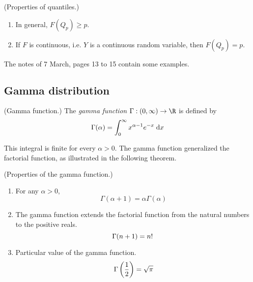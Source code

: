 \documentclass[11pt]{article}
\begin{document}
\begin{rem}{(Properties of quantiles.)}
    \begin{enumerate}
        \item
            In general, $F(Q_p) \geq p$.

        \item
            If $F$ is continuous, i.e. $Y$ is a continuous random variable,
            then $F(Q_p) = p$.
    \end{enumerate}
\end{rem}

The notes of 7 March, pages 13 to 15 contain some examples.

\subsection{Gamma distribution}

\begin{defn}{(Gamma function.)}
    \label{def:gamma-function}
    The \emph{gamma function} $\Gamma : (0, \infty) \to \R$ is defined by
    \begin{equation}
        \label{eq:gamma-function}
        \Gamma(\alpha) = \int^{\infty}_0 x^{\alpha - 1} e^{-x} \;\mathrm{d} x
    \end{equation}
\end{defn}

This integral is finite for every $\alpha > 0$.
The gamma function generalized the factorial function, as illustrated in the
following theorem.

\begin{thm}{(Properties of the gamma function.)}
    \label{thm:gamma-properties}

    \begin{enumerate}
        \item
            For any $\alpha > 0$,
            \begin{equation*}
                \Gamma(\alpha + 1) = \alpha \Gamma (\alpha)
            \end{equation*}

        \item
            The gamma function extends the factorial function from the natural
            numbers to the positive reals.
            \begin{equation*}
                \Gamma(n+1) = n!\,
            \end{equation*}

        \item
            Particular value of the gamma function.
            \begin{equation*}
                \Gamma\left(\frac{1}{2}\right) = \sqrt{\pi}
            \end{equation*}
    \end{enumerate}
\end{thm}
\end{document}
